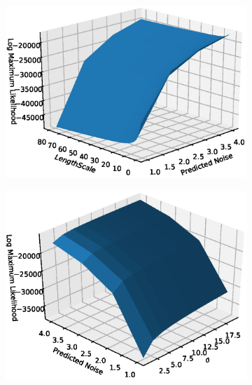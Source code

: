 \documentclass[a4paper, 10pt]{article}
\numberwithin{equation}{section}
\begin{document}
\begin{figure}[H]
\centering
\begin{subfigure}[b]{.33\textwidth}
  \centering
        \includegraphics[width=\textwidth]{images/GP_Brute/l_scale_noise_sigma_0.eps}
\end{subfigure}%
\begin{subfigure}[b]{.33\textwidth}
  \centering
        \includegraphics[width=\textwidth]{images/GP_Brute/sigma_noise_l_scale_0.eps}
\end{subfigure}
\begin{subfigure}[b]{.33\textwidth}
  \centering

\end{subfigure}
\end{figure}
\end{document}
